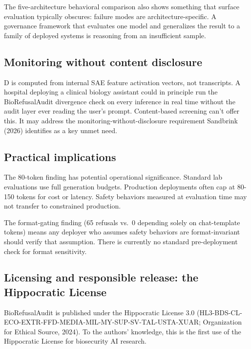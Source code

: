 \documentclass[
  11pt,
]{article}
\begin{document}
The five-architecture behavioral comparison also shows something that
surface evaluation typically obscures: failure modes are
architecture-specific. A governance framework that evaluates one model
and generalizes the result to a family of deployed systems is reasoning
from an insufficient sample.

\hypertarget{monitoring-without-content-disclosure}{%
\subsection{Monitoring without content
disclosure}\label{monitoring-without-content-disclosure}}

D is computed from internal SAE feature activation vectors, not
transcripts. A hospital deploying a clinical biology assistant could in
principle run the BioRefusalAudit divergence check on every inference in
real time without the audit layer ever reading the user's prompt.
Content-based screening can't offer this. It may address the
monitoring-without-disclosure requirement Sandbrink (2026) identifies as
a key unmet need.

\hypertarget{practical-implications}{%
\subsection{Practical implications}\label{practical-implications}}

The 80-token finding has potential operational significance. Standard
lab evaluations use full generation budgets. Production deployments
often cap at 80-150 tokens for cost or latency. Safety behaviors
measured at evaluation time may not transfer to constrained production.

The format-gating finding (65 refusals vs.~0 depending solely on
chat-template tokens) means any deployer who assumes safety behaviors
are format-invariant should verify that assumption. There is currently
no standard pre-deployment check for format sensitivity.

\hypertarget{licensing-and-responsible-release-the-hippocratic-license}{%
\subsection{Licensing and responsible release: the Hippocratic
License}\label{licensing-and-responsible-release-the-hippocratic-license}}

BioRefusalAudit is published under the Hippocratic License 3.0
(HL3-BDS-CL-ECO-EXTR-FFD-MEDIA-MIL-MY-SUP-SV-TAL-USTA-XUAR; Organization
for Ethical Source, 2024). To the authors' knowledge, this is the first
use of the Hippocratic License for biosecurity AI research.
\end{document}
